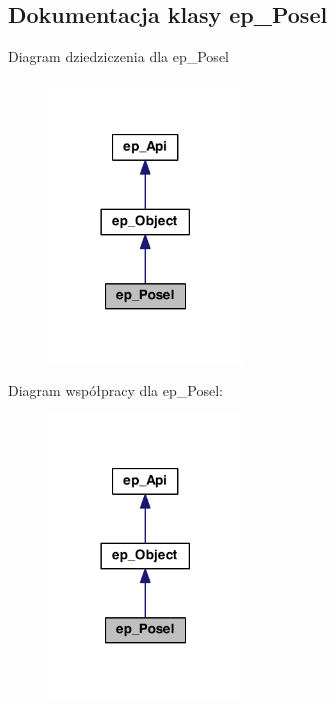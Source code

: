 \hypertarget{classep___posel}{\subsection{Dokumentacja klasy ep\-\_\-\-Posel}
\label{classep___posel}
}


Diagram dziedziczenia dla ep\-\_\-\-Posel\nopagebreak
\begin{figure}[H]
\begin{center}
\leavevmode
\includegraphics[width=146pt]{classep___posel__inherit__graph}
\end{center}
\end{figure}


Diagram współpracy dla ep\-\_\-\-Posel\-:\nopagebreak
\begin{figure}[H]
\begin{center}
\leavevmode
\includegraphics[width=146pt]{classep___posel__coll__graph}
\end{center}
\end{figure}

